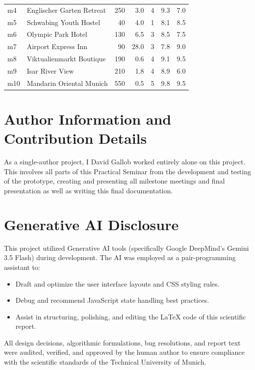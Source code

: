 \documentclass[acmlarge]{acmart}
\begin{document}
\begin{table}[h]
\begin{tabular}{llrrrrl}
    m4 & Englischer Garten Retreat & 250 & 3.0 & 4 & 9.3 & 7.0 \\
    m5 & Schwabing Youth Hostel & 40 & 4.0 & 1 & 8.1 & 8.5 \\
    m6 & Olympic Park Hotel & 130 & 6.5 & 3 & 8.5 & 7.5 \\
    m7 & Airport Express Inn & 90 & 28.0 & 3 & 7.8 & 9.0 \\
    m8 & Viktualienmarkt Boutique & 190 & 0.6 & 4 & 9.1 & 9.5 \\
    m9 & Isar River View & 210 & 1.8 & 4 & 8.9 & 6.0 \\
    m10 & Mandarin Oriental Munich & 550 & 0.5 & 5 & 9.8 & 9.5 \\
    \bottomrule
  \end{tabular}
\end{table}

\section{Author Information and Contribution Details}
As a single-author project, I David Gallob worked entirely alone on this project. This involves all parts of this Practical Seminar from the development and testing of the prototype, creating and presenting all milestone meetings and final presentation as well as writing this final documentation.

\section{Generative AI Disclosure}
This project utilized Generative AI tools (specifically Google DeepMind's Gemini 3.5 Flash) during development. The AI was employed as a pair-programming assistant to:
\begin{itemize}
  \item Draft and optimize the user interface layouts and CSS styling rules.
  \item Debug and recommend JavaScript state handling best practices.
  \item Assist in structuring, polishing, and editing the LaTeX code of this scientific report.
\end{itemize}
All design decisions, algorithmic formulations, bug resolutions, and report text were audited, verified, and approved by the human author to ensure compliance with the scientific standards of the Technical University of Munich.
\end{document}
